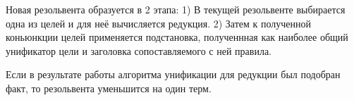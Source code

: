 Новая резольвента образуется в 2 этапа:
1) В текущей резольвенте выбирается одна из целей и для неё вычисляется редукция.
2) Затем к полученной коньюнкции целей применяется подстановка, полученнная как наиболее общий унификатор цели и заголовка сопоставляемого с ней правила.

Если в результате работы алгоритма унификации для редукции был подобран факт, то резольвента уменьшится на один терм.















